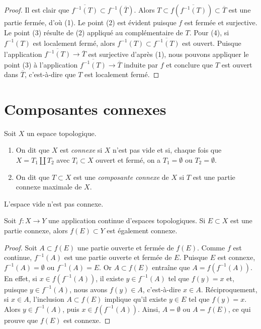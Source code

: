 \begin{proof}
Il est clair que $\overline{f^{-1}(T)} \subset f^{-1}(\overline{T})$.
Alors $T \subset f(\overline{f^{-1}(T)}) \subset \overline{T}$ est une
partie fermée, d'où (1). Le point (2) est évident puisque $f$ est fermée et
surjective. Le point (3) résulte de (2) appliqué au complémentaire de $T$.
Pour (4), si $f^{-1}(T)$ est localement fermé, alors
$f^{-1}(T) \subset \overline{f^{-1}(T)}$ est ouvert.
Puisque l'application $\overline{f^{-1}(T)} \to \overline{T}$ est surjective
d'après (1), nous pouvons appliquer le point (3) à l'application
$\overline{f^{-1}(T)} \to \overline{T}$ induite par $f$ et conclure que $T$
est ouvert dans $\overline{T}$, c'est-à-dire que $T$ est localement fermé.
\end{proof}








\section{Composantes connexes}
\label{section-connected-components}

\begin{definition}
\label{definition-connected-components}
Soit $X$ un espace topologique.
\begin{enumerate}
\item On dit que $X$ est {\it connexe} si $X$ n'est pas vide et si, chaque
fois que $X = T_1 \amalg T_2$ avec $T_i \subset X$ ouvert et fermé, on a
$T_1 = \emptyset$ ou $T_2 = \emptyset$.
\item On dit que $T \subset X$ est une {\it composante connexe} de $X$ si
$T$ est une partie connexe maximale de $X$.
\end{enumerate}
\end{definition}

\noindent
L'espace vide n'est pas connexe.

\begin{lemma}
\label{lemma-image-connected-space}
Soit $f : X \to Y$ une application continue d'espaces topologiques.
Si $E \subset X$ est une partie connexe, alors $f(E) \subset Y$ est également
connexe.
\end{lemma}

\begin{proof}
Soit $A \subset f(E)$ une partie ouverte et fermée de $f(E)$. Comme $f$ est
continue, $f^{-1}(A)$ est une partie ouverte et fermée de $E$. Puisque $E$ est
connexe, $f^{-1}(A) = \emptyset$ ou $f^{-1}(A) = E$. Or $A\subset f(E)$
entraîne que $A = f(f^{-1}(A))$. En effet, si $x\in f(f^{-1}(A))$, il existe
$y\in f^{-1}(A)$ tel que $f(y) = x$ et, puisque $y\in f^{-1}(A)$, nous avons
$f(y) \in A$, c'est-à-dire $x\in A$. Réciproquement, si $x\in A$, l'inclusion
$A\subset f(E)$ implique qu'il existe $y\in E$ tel que $f(y) = x$. Alors
$y\in f^{-1}(A)$, puis $x\in f(f^{-1}(A))$. Ainsi, $A = \emptyset$ ou
$A = f(E)$, ce qui prouve que $f(E)$ est connexe.
\end{proof}

